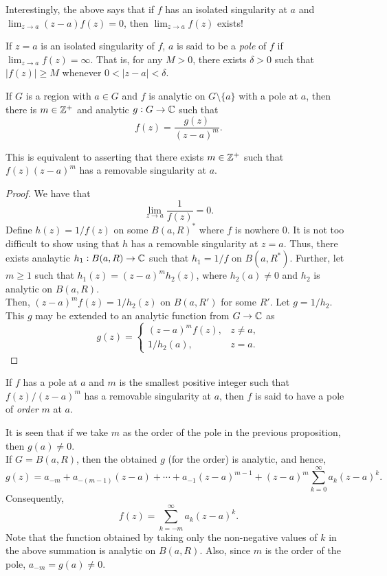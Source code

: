 		Interestingly, the above says that if $f$ has an isolated singularity at $a$ and $\lim_{z \to a} (z-a) f(z) = 0$, then $\lim_{z \to a} f(z)$ exists!

		\begin{fdef}[Pole]
			If $z = a$ is an isolated singularity of $f$, $a$ is said to be a \emph{pole} of $f$ if $\lim_{z \to a} f(z) = \infty$. That is, for any $M > 0$, there exists $\delta > 0$ such that $|f(z)| \ge M$ whenever $0 < |z-a| < \delta$.
		\end{fdef}

		\begin{prop}
			If $G$ is a region with $a \in G$ and $f$ is analytic on $G \setminus \{a\}$ with a pole at $a$, then there is $m \in \mathbb{Z}^+$ and analytic $g : G \to \mathbb{C}$ such that
			\[ f(z) = \frac{g(z)}{(z-a)^m}. \]
		\end{prop}
		
		This is equivalent to asserting that there exists $m \in \mathbb{Z}^+$ such that $f(z) (z-a)^m$ has a removable singularity at $a$.

		\begin{proof}
			We have that
			\[ \lim_{z \to a} \frac{1}{f(z)} = 0. \]
			Define $h(z) = 1/f(z)$ on some $B(a,R)^*$ where $f$ is nowhere $0$. It is not too difficult to show using  that $h$ has a removable singularity at $z = a$. Thus, there exists analaytic $h_1 : B(a,R) \to \mathbb{C}$ such that $h_1 = 1/f$ on $B(a,R^*)$. Further, let $m \ge 1$ such that $h_1(z) = (z-a)^m h_2(z)$, where $h_2(a) \ne 0$ and $h_2$ is analytic on $B(a,R)$.\\
			Then, $(z-a)^m f(z) = 1/h_2(z)$ on $B(a,R')$ for some $R'$. Let $g = 1/h_2$. This $g$ may be extended to an analytic function from $G \to \mathbb{C}$ as
			\[ g(z) = \begin{cases} (z-a)^m f(z), & z \ne a, \\ 1/h_2(a), & z = a. \end{cases} \]
		\end{proof}

		\begin{definition}
			If $f$ has a pole at $a$ and $m$ is the smallest positive integer such that $f(z)/(z-a)^m$ has a removable singularity at $a$, then $f$ is said to have a pole of \emph{order} $m$ at $a$.
		\end{definition}

		It is seen that if we take $m$ as the order of the pole in the previous proposition, then $g(a) \ne 0$.\\
		If $G = B(a,R)$, then the obtained $g$ (for the order) is analytic, and hence,
		\[ g(z) = a_{-m} + a_{-(m-1)}(z-a) + \cdots + a_{-1} (z-a)^{m-1} + (z-a)^m \sum_{k=0}^\infty a_k (z-a)^k. \]
		Consequently,
		\[ f(z) = \sum_{k = -m}^{\infty} a_k (z-a)^k. \]
		Note that the function obtained by taking only the non-negative values of $k$ in the above summation is analytic on $B(a,R)$. Also, since $m$ is the order of the pole, $a_{-m} = g(a) \ne 0$.

